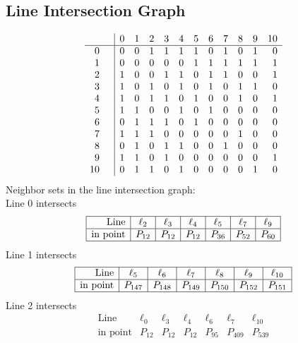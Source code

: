 \documentclass{article}
\begin{document}
{\subsection*{Line Intersection Graph}
{\arraycolsep=1pt
$$
\begin{array}{rr|*{11}r}
 &  & 0 & 1 & 2 & 3 & 4 & 5 & 6 & 7 & 8 & 9 & 10\\
\hline
0 &  & 0 & 0 & 1 & 1 & 1 & 1 & 0 & 1 & 0 & 1 & 0\\
1 &  & 0 & 0 & 0 & 0 & 0 & 1 & 1 & 1 & 1 & 1 & 1\\
2 &  & 1 & 0 & 0 & 1 & 1 & 0 & 1 & 1 & 0 & 0 & 1\\
3 &  & 1 & 0 & 1 & 0 & 1 & 0 & 1 & 0 & 1 & 1 & 0\\
4 &  & 1 & 0 & 1 & 1 & 0 & 1 & 0 & 0 & 1 & 0 & 1\\
5 &  & 1 & 1 & 0 & 0 & 1 & 0 & 1 & 0 & 0 & 0 & 0\\
6 &  & 0 & 1 & 1 & 1 & 0 & 1 & 0 & 0 & 0 & 0 & 0\\
7 &  & 1 & 1 & 1 & 0 & 0 & 0 & 0 & 0 & 1 & 0 & 0\\
8 &  & 0 & 1 & 0 & 1 & 1 & 0 & 0 & 1 & 0 & 0 & 0\\
9 &  & 1 & 1 & 0 & 1 & 0 & 0 & 0 & 0 & 0 & 0 & 1\\
10 &  & 0 & 1 & 1 & 0 & 1 & 0 & 0 & 0 & 0 & 1 & 0\\
\end{array}
$$
}%
Neighbor sets in the line intersection graph:\\
Line 0 intersects 
$$
\begin{array}{|r*{6}{|c}|}
\hline
\mbox{Line}  & \ell_{2} & \ell_{3} & \ell_{4} & \ell_{5} & \ell_{7} & \ell_{9}\\
\hline
\mbox{in point}  & P_{12} & P_{12} & P_{12} & P_{36} & P_{52} & P_{60}\\
\hline
\end{array}
$$
Line 1 intersects 
$$
\begin{array}{|r*{6}{|c}|}
\hline
\mbox{Line}  & \ell_{5} & \ell_{6} & \ell_{7} & \ell_{8} & \ell_{9} & \ell_{10}\\
\hline
\mbox{in point}  & P_{147} & P_{148} & P_{149} & P_{150} & P_{152} & P_{151}\\
\hline
\end{array}
$$
Line 2 intersects 
$$
\begin{array}{|r*{6}{|c}|}
\hline
\mbox{Line}  & \ell_{0} & \ell_{3} & \ell_{4} & \ell_{6} & \ell_{7} & \ell_{10}\\
\hline
\mbox{in point}  & P_{12} & P_{12} & P_{12} & P_{95} & P_{409} & P_{539}\\

\end{array}$$}
\end{document}
